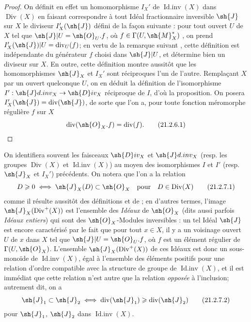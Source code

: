 \begin{proof}
On définit en effet un homomorphisme $I_X'$ de $\operatorname{Id.inv}(X)$ dans $\operatorname{Div}(X)$ en faisant correspondre à tout Idéal fractionnaire inversible $\sh{J}$ sur $X$ le diviseur $I_X'(\sh{J})$ défini de la façon suivante : pour tout ouvert $U$ de $X$ tel que $\sh{J}|U=\sh{O}_U.f$, où $f\in\Gamma(U,\sh{M}_X^*)$ , on prend $I_X'(\sh{J})|U=\operatorname{div}_U(f)$;
en vertu de la remarque suivant , cette définition est indépendante du générateur $f$ choisi dans $\sh{J}|U$, et détermine bien un diviseur sur $X$.
En outre, cette définition montre aussitôt que les homomorphismes $\sh{J}_X$ et $I_X'$ sont réciproques l'un de l'autre.
Remplaçant $X$ par un ouvert quelconque $U$, on en déduit la définition de l'isomorphisme $I':\sh{J}d.inv_X\to\sh{D}iv_X$ réciproque de $I$, d'où la proposition.
On posera $I_X'(\sh{J})=\operatorname{div}(\sh{J})$, de sorte que l'on a, pour toute fonction méromorphe régulière $f$ sur $X$
\[
\label{IV.21.2.6.1}
  \operatorname{div}(\sh{O}_X.f)=\operatorname{div}(f).
  \tag{21.2.6.1}
\]
\end{proof}

\begin{env}[21.2.7]
On identifiera souvent les faisceaux $\sh{D}iv_X$ et $\sh{J}d.inv_X$ (resp. les groupes $\operatorname{Div}(X)$ et $\operatorname{Id.inv}(X)$) au moyen des isomorphismes $I$ et $I'$ (resp. $\sh{J}_X$ et $I_X'$) précédents.
On notera que l'on a la relation
\[
\label{IV.21.2.7.1}
  D\geq0 \iff \sh{J}_X(D)\subset\sh{O}_X \quad\text{pour}\quad D\in\operatorname{Div}(X)
  \tag{21.2.7.1}
\]
comme il résulte aussitôt des définitions  et de ;
en d'autres termes, l'image $\sh{J}_X(\operatorname{Div}^+(X))$ est l'ensemble des \emph{Idéaux} de $\sh{O}_X$ (dits aussi parfois \emph{Idéaux entiers}) qui sont des $\sh{O}_X$-Modules inversibles : un tel Idéal $\sh{J}$ est encore caractérisé par le fait que pour tout $x\in X$, il y a un voisinage ouvert $U$ de $x$ dans $X$ tel que $\sh{J}|U=\sh{O}_U.f$, où $f$ est un élément régulier de $\Gamma(U,\sh{O}_X)$.
L'ensemble $\sh{J}_X(\operatorname{Div}^+(X))$ de ces Idéaux est donc un sous-monoïde de $\operatorname{Id.inv}(X)$, égal à l'ensemble des éléments positifs pour une relation d'ordre compatible avec la structure de groupe de $\operatorname{Id.inv}(X)$, et il est immédiat que cette relation n'est autre que la relation \emph{opposée} à l'inclusion;
autrement dit, on a
\[
\label{IV.21.2.7.2}
  \sh{J}_1\subset\sh{J}_2 \iff \operatorname{div}(\sh{J}_1)\geq\operatorname{div}(\sh{J}_2)
  \tag{21.2.7.2}
\]
pour $\sh{J}_1$, $\sh{J}_2$ dans $\operatorname{Id.inv}(X)$.
\end{env}

